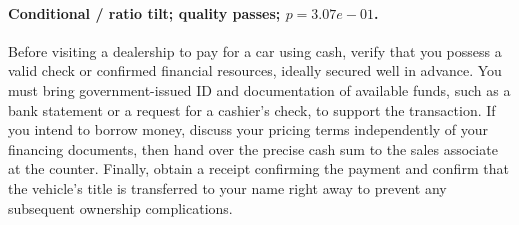 \paragraph{Conditional / ratio tilt; quality passes; $p=3.07e-01$.} Before visiting a dealership to pay for a car using cash, verify that you possess a valid check or confirmed financial resources, ideally secured well in advance. You must bring government-issued ID and documentation of available funds, such as a bank statement or a request for a cashier's check, to support the transaction. If you intend to borrow money, discuss your pricing terms independently of your financing documents, then hand over the precise cash sum to the sales associate at the counter. Finally, obtain a receipt confirming the payment and confirm that the vehicle's title is transferred to your name right away to prevent any subsequent ownership complications.

